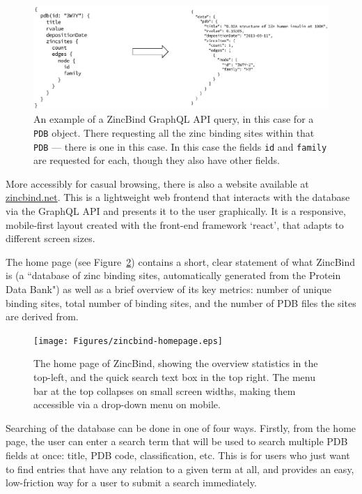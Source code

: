 \begin{figure}
\centering
\includegraphics[width=1.0\textwidth]{Figures/zincbind-api-example.eps}
\caption[An example of a ZincBind GraphQL API query.]{\label{fig:zincbind-api-example} An example of a ZincBind GraphQL API query, in this case for a \texttt{PDB} object.
There requesting all the zinc binding sites within that \texttt{PDB} --- there is
one in this case. In this case the fields \texttt{id} and \texttt{family} are
requested for each, though they also have other fields.}
\end{figure}

More accessibly for casual browsing, there is also a website available at \url{zincbind.net}. This is a lightweight web frontend that interacts with the database via the GraphQL API and presents it to the user graphically. It is a responsive, mobile-first layout created with the front-end framework `react', that adapts to different screen sizes.

The home page (see Figure~\ref{fig:zincbind-homepage}) contains a short, clear statement of what ZincBind is (a ``database of zinc binding sites, automatically generated from the Protein Data Bank") as well as a brief overview of its key metrics: number of unique binding sites, total number of binding sites, and the number of PDB files the sites are derived from.

\begin{figure}
\centering
\texttt{[image: Figures/zincbind-homepage.eps]}
\caption[The home page of ZincBind.]{\label{fig:zincbind-homepage} The home page of ZincBind, showing the
overview statistics in the top-left, and the quick search text box in the top right.
The menu bar at the top collapses on small screen widths, making them accessible via a
drop-down menu on mobile.}
\end{figure}

Searching of the database can be done in one of four ways. Firstly, from the home page, the user can enter a search term that will be used to search multiple PDB fields at once: title, PDB code, classification, etc. This is for users who just want to find entries that have any relation to a given term at all, and provides an easy, low-friction way for a user to submit a search immediately.

